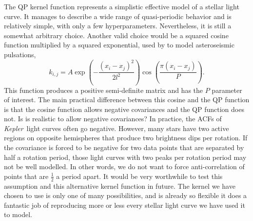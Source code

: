 \documentclass[useAMS, usenatbib, preprint, 12pt]{aastex}
\newcommand{\Kepler}{{\it Kepler}}
\begin{document}
The QP kernel function represents a simplistic effective model of a stellar
light curve.
It manages to describe a wide range of quasi-periodic behavior and is
relatively simple, with only a few hyperparameters.
Nevertheless, it is still a somewhat arbitrary choice.
Another valid choice would be a squared cosine function multiplied by a
squared exponential, used by \citet{Brewer2009} to model asteroseismic
pulsations,
\begin{equation}
k_{i,j} = A \exp \left(-\frac{(x_i - x_j)^2}{2l^2}\right)
\cos\left(\frac{\pi(x_i - x_j)}{P}\right).
\end{equation}
\label{eq:cos_kernel}
This function produces a positive semi-definite matrix and has the $P$
parameter of interest.
The main practical difference between this cosine and the QP function is that
the cosine function allows negative covariances and the QP function does not.
Is is realistic to allow negative covariances?
In practice, the ACFs of \Kepler\ light curves often go negative.
However, many stars have two active regions on opposite hemispheres that
produce two brightness dips per rotation.
If the covariance is forced to be negative for two data points that are
separated by half a rotation period, those light curves with two peaks per
rotation period may not be well modelled.
In other words, we do not want to force anti-correlation of points that are
$\frac{1}{2}$ a period apart.
It would be very worthwhile to test this assumption and this alternative
kernel function in future.
The kernel we have chosen to use is only one of many possibilities, and is
already so flexible it does a fantastic job of reproducing more or less every
stellar light curve we have used it to model.
\end{document}
